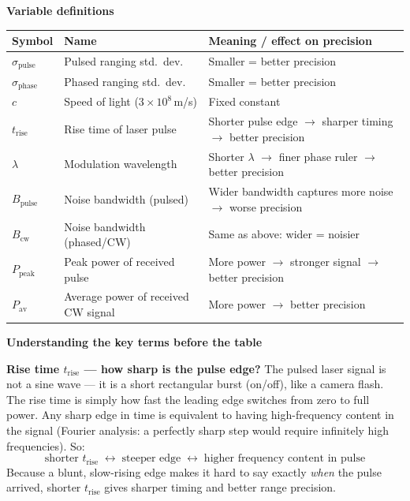 \documentclass[12pt, a4paper]{article}
\begin{document}
\begin{notebox}
  \textbf{Variable definitions}

  \vspace{4pt}
  \begin{tabular}{@{}l p{4.2cm} p{7.2cm}@{}}
    \toprule
    \textbf{Symbol} & \textbf{Name} & \textbf{Meaning / effect on precision} \\
    \midrule
    $\sigma_{\text{pulse}}$ & Pulsed ranging std.\ dev.
      & Smaller = better precision \\[2pt]
    $\sigma_{\text{phase}}$ & Phased ranging std.\ dev.
      & Smaller = better precision \\[2pt]
    $c$ & Speed of light ($3\times10^8$\,m/s)
      & Fixed constant \\[2pt]
    $t_{\text{rise}}$ & Rise time of laser pulse
      & Shorter pulse edge $\to$ sharper timing $\to$ better precision \\[2pt]
    $\lambda$ & Modulation wavelength
      & Shorter $\lambda$ $\to$ finer phase ruler $\to$ better precision \\[2pt]
    $B_{\text{pulse}}$ & Noise bandwidth (pulsed)
      & Wider bandwidth captures more noise $\to$ worse precision \\[2pt]
    $B_{\text{cw}}$ & Noise bandwidth (phased/CW)
      & Same as above: wider = noisier \\[2pt]
    $P_{\text{peak}}$ & Peak power of received pulse
      & More power $\to$ stronger signal $\to$ better precision \\[2pt]
    $P_{\text{av}}$ & Average power of received CW signal
      & More power $\to$ better precision \\
    \bottomrule
  \end{tabular}
  \textbf{Understanding the key terms before the table}

  \textbf{Rise time $t_\text{rise}$ --- how sharp is the pulse edge?}
  The pulsed laser signal is not a sine wave --- it is a short rectangular
  burst (on/off), like a camera flash.  The rise time is simply how fast the
  leading edge switches from zero to full power.  Any sharp edge in time is
  equivalent to having high-frequency content in the signal (Fourier analysis:
  a perfectly sharp step would require infinitely high frequencies).  So:
  \[
    \text{shorter } t_\text{rise}
    \;\longleftrightarrow\;
    \text{steeper edge}
    \;\longleftrightarrow\;
    \text{higher frequency content in pulse}
  \]
  Because a blunt, slow-rising edge makes it hard to say exactly \emph{when}
  the pulse arrived, shorter $t_\text{rise}$ gives sharper timing and better
  range precision.


\end{notebox}
\end{document}
